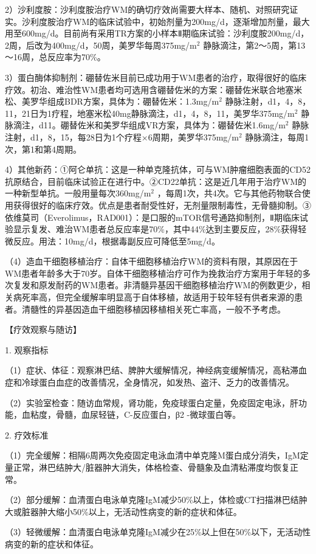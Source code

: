 2）沙利度胺：沙利度胺治疗WM的确切疗效尚需要大样本、随机、对照研究证实。沙利度胺治疗WM的临床试验中，初始剂量为200mg/d，逐渐增加剂量，最大用至600mg/d。目前尚有采用TR方案的小样本Ⅱ期临床试验：沙利度胺200mg/d，2周，后改为400mg/d，50周，美罗华每周375mg/m$^2$
静脉滴注，第2～5周，第13～16周，总反应率为70\%。

3）蛋白酶体抑制剂：硼替佐米目前已成功用于WM患者的治疗，取得很好的临床疗效。初治、难治性WM患者均可选用含硼替佐米的方案：硼替佐米联合地塞米松、美罗华组成BDR方案，具体为：硼替佐米：1.3mg/m$^2$
静脉注射，d1，4，8，11，21日为1疗程，地塞米松40mg静脉滴注，d1，4，8，11，美罗华375mg/m$^2$
静脉滴注，d11。硼替佐米和美罗华组成VR方案，具体为：硼替佐米1.6mg/m$^2$
静脉注射，d1，8，15，每28日为1个疗程×6周期，美罗华375mg/m$^2$
静脉滴注，每周1次，第1和第4周期。

4）其他新药：①阿仑单抗：这是一种单克隆抗体，可与WM肿瘤细胞表面的CD52抗原结合，目前临床试验正在进行中。②CD22单抗：这是近几年用于治疗WM的一种新型单抗。一般用量每次360mg/m$^2$
，每周1次，共4次。它与其他药物联合使用获得很好的临床疗效。优点是患者耐受性好，无剂量限制毒性，无骨髓抑制。③依维莫司（Everolimus，RAD001）：是口服的mTOR信号通路抑制剂，Ⅱ期临床试验显示复发、难治WM患者总反应率是70\%，其中44\%达到主要反应，28\%获得轻微反应。用法：10mg/d，根据毒副反应可降低至5mg/d。

（4）造血干细胞移植治疗：自体干细胞移植治疗WM的资料有限，其原因在于WM患者年龄多大于70岁。自体干细胞移植治疗可作为挽救治疗方案用于年轻的多次复发和原发耐药的WM患者。非清髓异基因干细胞移植治疗WM的例数更少，相关病死率高，但完全缓解率明显高于自体移植，故适用于较年轻有供者来源的患者。清髓性的异基因造血干细胞移植因移植相关死亡率高，一般不予考虑。

【疗效观察与随访】

1. 观察指标

（1）症状、体征：观察淋巴结、脾肿大缓解情况，神经病变缓解情况，高粘滞血症和冷球蛋白血症的改善情况，全身情况，如发热、盗汗、乏力的改善情况。

（2）实验室检查：随访血常规，肾功能，免疫球蛋白定量，免疫固定电泳，肝功能，血粘度，骨髓，血尿轻链，C-反应蛋白，β{2}
-微球蛋白等。

2. 疗效标准

（1）完全缓解：相隔6周两次免疫固定电泳血清中单克隆M蛋白成分消失，IgM定量正常，淋巴结肿大/脏器肿大消失，体格检查、骨髓象及血清粘滞度均恢复正常。

（2）部分缓解：血清蛋白电泳单克隆IgM减少50\%以上，体检或CT扫描淋巴结肿大或脏器肿大缩小50\%以上，无活动性病变的新的症状和体征。

（3）轻微缓解：血清蛋白电泳单克隆IgM减少在25\%以上但在50\%以下，无活动性病变的新的症状和体征。

